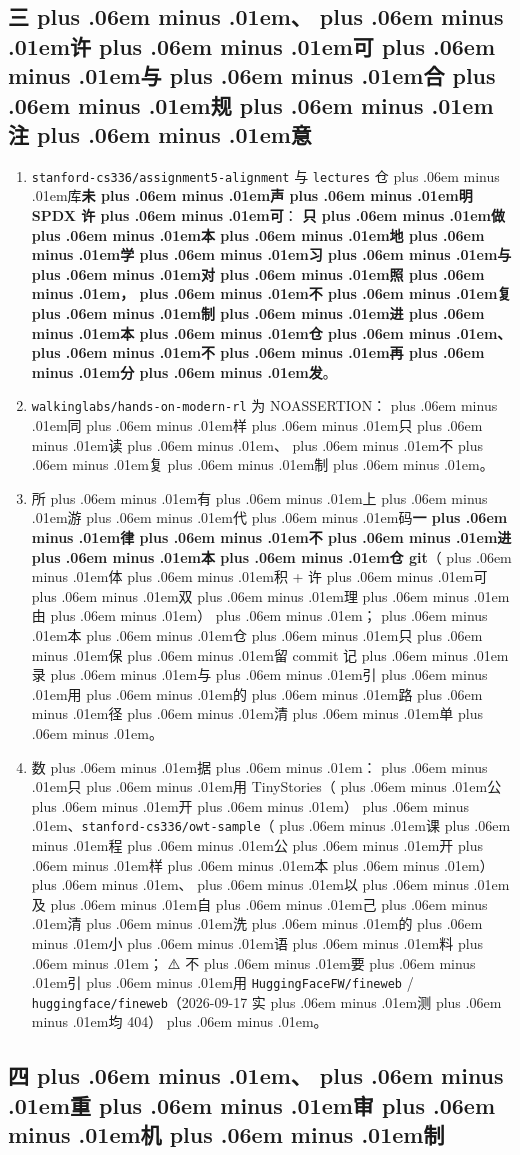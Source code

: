 \documentclass[
]{article}
\newcommand{\passthrough}[1]{#1}
\providecommand{\tightlist}{%
  \setlength{\itemsep}{0pt}\setlength{\parskip}{0pt}}
\def\zh#1{{\zhfont #1}}
\def\sym#1{{\symfont #1}}
\def\zhglue{\hskip0pt plus .06em minus .01em}
\begin{document}
\subsection{\zh{三\zhglue 、\zhglue 许\zhglue 可\zhglue 与\zhglue 合\zhglue 规\zhglue 注\zhglue 意}}\label{ux4e09ux8bb8ux53efux4e0eux5408ux89c4ux6ce8ux610f}

\begin{enumerate}
\def\labelenumi{\arabic{enumi}.}
\tightlist
\item
  \passthrough{\lstinline!stanford-cs336/assignment5-alignment!} \zh{与} \passthrough{\lstinline!lectures!} \zh{仓\zhglue 库}\textbf{\zh{未\zhglue 声\zhglue 明} SPDX \zh{许\zhglue 可}}\zh{：} \textbf{\zh{只\zhglue 做\zhglue 本\zhglue 地\zhglue 学\zhglue 习\zhglue 与\zhglue 对\zhglue 照\zhglue ，\zhglue 不\zhglue 复\zhglue 制\zhglue 进\zhglue 本\zhglue 仓\zhglue 、\zhglue 不\zhglue 再\zhglue 分\zhglue 发}}\zh{。}
\item
  \passthrough{\lstinline!walkinglabs/hands-on-modern-rl!} \zh{为} NOASSERTION\zh{：\zhglue 同\zhglue 样\zhglue 只\zhglue 读\zhglue 、\zhglue 不\zhglue 复\zhglue 制\zhglue 。}
\item
  \zh{所\zhglue 有\zhglue 上\zhglue 游\zhglue 代\zhglue 码}\textbf{\zh{一\zhglue 律\zhglue 不\zhglue 进\zhglue 本\zhglue 仓} git}\zh{（\zhglue 体\zhglue 积} + \zh{许\zhglue 可\zhglue 双\zhglue 理\zhglue 由\zhglue ）\zhglue ；\zhglue 本\zhglue 仓\zhglue 只\zhglue 保\zhglue 留} commit \zh{记\zhglue 录\zhglue 与\zhglue 引\zhglue 用\zhglue 的\zhglue 路\zhglue 径\zhglue 清\zhglue 单\zhglue 。}
\item
  \zh{数\zhglue 据\zhglue ：\zhglue 只\zhglue 用} TinyStories\zh{（\zhglue 公\zhglue 开\zhglue ）\zhglue 、}\passthrough{\lstinline!stanford-cs336/owt-sample!}\zh{（\zhglue 课\zhglue 程\zhglue 公\zhglue 开\zhglue 样\zhglue 本\zhglue ）\zhglue 、\zhglue 以\zhglue 及\zhglue 自\zhglue 己\zhglue 清\zhglue 洗\zhglue 的\zhglue 小\zhglue 语\zhglue 料\zhglue ；} \sym{⚠️} \zh{不\zhglue 要\zhglue 引\zhglue 用} \passthrough{\lstinline!HuggingFaceFW/fineweb!} / \passthrough{\lstinline!huggingface/fineweb!}\zh{（}2026-09-17 \zh{实\zhglue 测\zhglue 均} 404\zh{）\zhglue 。}
\end{enumerate}

\subsection{\zh{四\zhglue 、\zhglue 重\zhglue 审\zhglue 机\zhglue 制}}\label{ux56dbux91cdux5ba1ux673aux5236}
\end{document}
